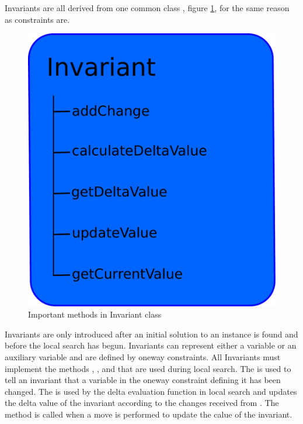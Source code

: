 Invariants are all derived from one common class , figure \ref{fig_invariant}, for the same reason as 
constraints are. 
\begin{figure}[!b]
\begin{center}
 \includegraphics[width=\linewidth/2]{invariant.pdf} \caption{Important methods in Invariant 
class}\label{fig_invariant}
\end{center} 
\end{figure}
Invariants are only introduced after an initial solution to an instance is found and before the local 
search has begun. Invariants can represent either a variable or an auxiliary variable and are defined by oneway 
constraints. All Invariants must implement the methods , , and 
 that are used during local search. The  is used to tell an invariant that a 
variable in the oneway constraint defining it has been changed. The  is used by the delta 
evaluation function in local search and updates the delta value of the invariant according to the changes 
received from . The method  is called when a move is performed to update the 
calue of the invariant. \\ 
